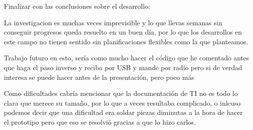 		Finalizar con las conclusiones sobre el desarrollo:

		La investigacion es muchas veces imprevisible y lo que llevas semanas sin conseguir progresos queda resuelto en un buen día, por lo que los desarrollos en este campo no tienen sentido sin planificaciones flexibles como la que planteamos. 

		Trabajo futuro en esto, sería como mucho hacer el código que he comentado antes que haga el paso inverso y reciba por USB y mande por radio pero si de verdad interesa se puede hacer antes de la presentación, pero poco más

		Como dificultades cabría mencionar que la documentación de TI no es todo lo clara que merece su tamaño, por lo que a veces resultaba complicado, o inlcuso podemos decir que una dificultad era soldar piezas diminutas a la hora de hacer el prototipo pero que eso se resolvió gracias a que lo hizo carlos.
















